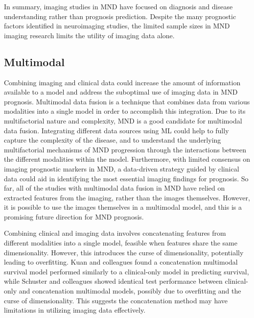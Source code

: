 In summary, imaging studies in MND have focused on diagnosis and disease understanding rather than prognosis prediction.
Despite the many prognostic factors identified in neuroimaging studies, the limited sample sizes in MND imaging research limits the utility of imaging data alone.

\subsection{Multimodal}

Combining imaging and clinical data could increase the amount of information available to a model and address the suboptimal use of imaging data in MND prognosis.
Multimodal data fusion is a technique that combines data from various modalities into a single model in order to accomplish this integration.
Due to its multifactorial nature and complexity, MND is a good candidate for multimodal data fusion.
Integrating different data sources using ML could help to fully capture the complexity of the disease, and to understand the underlying multifactorial mechanisms of MND progression through the interactions between the different modalities within the model.
Furthermore, with limited consensus on imaging prognostic markers in MND, a data-driven strategy guided by clinical data could aid in identifying the most essential imaging findings for prognosis.
So far, all of the studies with multimodal data fusion in MND have relied on extracted features from the imaging, rather than the images themselves.
However, it is possible to use the images themselves in a multimodal model, and this is a promising future direction for MND prognosis.


Combining clinical and imaging data involves concatenating features from different modalities into a single model, feasible when features share the same dimensionality.
However, this introduces the curse of dimensionality, potentially leading to overfitting.
Kuan and colleagues found a concatenation multimodal survival model performed similarly to a clinical-only model in predicting survival, while Schuster and colleagues showed identical test performance between clinical-only and concatenation multimodal models, possibly due to overfitting and the curse of dimensionality.
This suggests the concatenation method may have limitations in utilizing imaging data effectively.


